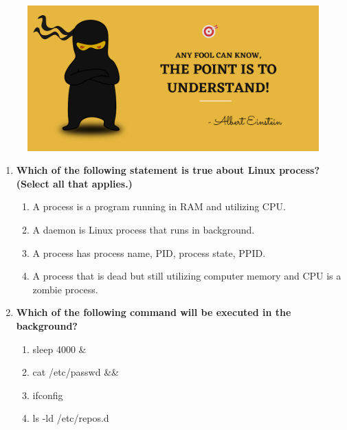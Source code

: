 \setlength{\columnsep}{3pt}
\begin{flushleft}
	
	\paragraph{}
	\bigskip
	
	\begin{figure}[h!]
		\centering
		\includegraphics[scale=.2]{content/practise.jpg}
	\end{figure}	
	\begin{enumerate}
		
		\item \textbf{Which of the following statement is true about Linux process? (Select all that applies.)}
		\begin{enumerate}[label=(\alph*)]
			\item A process is a program running in RAM and utilizing CPU.  %
			\item A daemon is Linux process that runs in background. %
			\item A process has process name, PID, process state, PPID. %
			\item A process that is dead but still utilizing computer memory and CPU is a zombie process. %
		\end{enumerate}
		\bigskip
		\bigskip
		
		\item \textbf{Which of the following command will be executed in the background?}
		\begin{enumerate}[label=(\alph*)]
			\item sleep 4000 \&  %
			\item cat /etc/passwd  \&\& 
			\item ifconfig 
			\item ls -ld /etc/repos.d
		\end{enumerate}
		\bigskip
		\bigskip	
		

\end{enumerate}
\end{flushleft}
